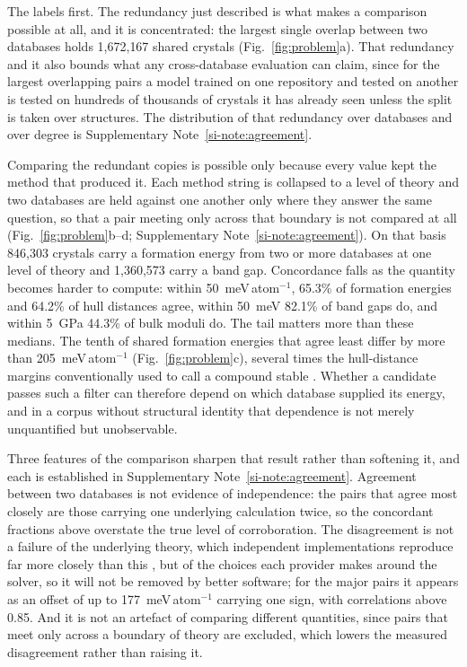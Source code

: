 The labels first. The redundancy just described is what makes a comparison
possible at all, and it is concentrated: the largest single overlap between two
databases holds 1{,}672{,}167 shared crystals (Fig.~\ref{fig:problem}a). That
redundancy and it also bounds what any
cross-database evaluation can claim, since for the largest overlapping pairs a
model trained on one repository and tested on another is tested on hundreds of
thousands of crystals it has already seen unless the split is taken over
structures. The distribution of that redundancy over databases and over degree is
Supplementary Note~\ref{si-note:agreement}.

Comparing the redundant copies is possible only because every value kept the
method that produced it. Each method string is collapsed to a level of theory and
two databases are held against one another only where they answer the same
question, so that a pair meeting only across that boundary is not compared at all
(Fig.~\ref{fig:problem}b--d; Supplementary Note~\ref{si-note:agreement}).
On that basis 846{,}303 crystals carry a formation energy from two or more
databases at one level of theory and 1{,}360{,}573 carry a band gap. Concordance
falls as the quantity becomes harder to compute: within 50~meV\,atom$^{-1}$,
65.3\% of formation energies and 64.2\% of hull distances agree, within 50~meV
82.1\% of band gaps do, and within 5~GPa 44.3\% of bulk moduli do. The tail
matters more than these medians. The tenth of shared formation energies that
agree least differ by more than 205~meV\,atom$^{-1}$
(Fig.~\ref{fig:problem}c), several times the hull-distance margins
conventionally used to call a compound stable
\cite{sun2016thermodynamic,bartel2020critical}. Whether a candidate passes such a
filter can therefore depend on which database supplied its energy, and in a
corpus without structural identity that dependence is not merely unquantified but
unobservable.

Three features of the comparison sharpen that result rather than softening it,
and each is established in Supplementary Note~\ref{si-note:agreement}. Agreement
between two databases is not evidence of independence: the pairs that agree most
closely are those carrying one underlying calculation twice, so the concordant
fractions above overstate the true level of corroboration. The disagreement is
not a failure of the underlying theory, which independent implementations
reproduce far more closely than this \cite{lejaeghere2016reproducibility}, but of
the choices each provider makes around the solver, so it will not be removed by
better software; for the major pairs it appears as an offset of up to
177~meV\,atom$^{-1}$ carrying one sign, with correlations above 0.85. And it is
not an artefact of comparing different quantities, since pairs that meet only
across a boundary of theory are excluded, which lowers the measured disagreement
rather than raising it.

